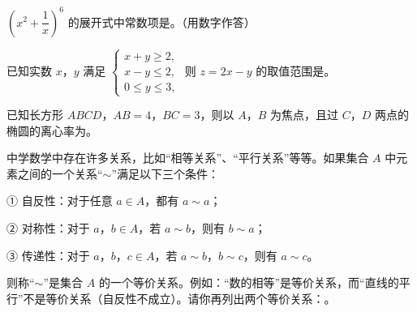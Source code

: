 \begin{question}
$\left(x^2+\dfrac1x\right)^6$ 的展开式中常数项是\gkblank{}。（用数字作答）

\end{question}
\begin{question}
已知实数 $x$，$y$ 满足 $\begin{cases}x+y\geqslant2,\\ x-y\leqslant2,\\ 0\leqslant y\leqslant3,\end{cases}$ 则 $z=2x-y$ 的取值范围是\gkblank{}。

\end{question}
\begin{question}
已知长方形 $ABCD$，$AB=4$，$BC=3$，则以 $A$，$B$ 为焦点，且过 $C$，$D$ 两点的椭圆的离心率为\gkblank{}。

\end{question}
\begin{question}
中学数学中存在许多关系，比如“相等关系”、“平行关系”等等。如果集合 $A$ 中元素之间的一个关系“$\sim$”满足以下三个条件：

① 自反性：对于任意 $a\in A$，都有 $a\sim a$；

② 对称性：对于 $a$，$b\in A$，若 $a\sim b$，则有 $b\sim a$；

③ 传递性：对于 $a$，$b$，$c\in A$，若 $a\sim b$，$b\sim c$，则有 $a\sim c$。

则称“$\sim$”是集合 $A$ 的一个等价关系。例如：“数的相等”是等价关系，而“直线的平行”不是等价关系（自反性不成立）。请你再列出两个等价关系：\gkblank{}。

\end{question}

